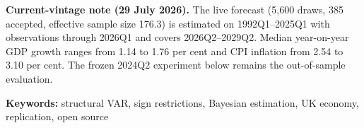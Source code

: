 \documentclass[11pt]{article}
\begin{document}
\medskip
\noindent\textbf{Current-vintage note (29 July 2026).} The live forecast (5{,}600 draws, 385 accepted, effective sample size 176.3) is estimated on 1992Q1--2025Q1 with observations through 2026Q1 and covers 2026Q2--2029Q2. Median year-on-year GDP growth ranges from 1.14 to 1.76 per cent and CPI inflation from 2.54 to 3.10 per cent. The frozen 2024Q2 experiment below remains the out-of-sample evaluation.

\medskip
\noindent\textbf{Keywords:} structural VAR, sign restrictions, Bayesian estimation, UK economy, replication, open source

\newpage













\end{document}
